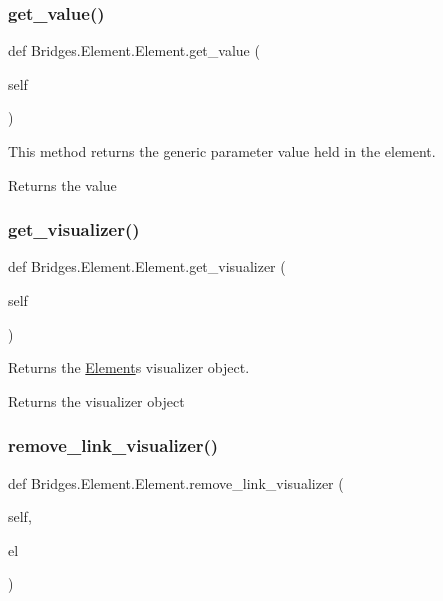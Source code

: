 \subsubsection{\texorpdfstring{get\+\_\+value()}{get\_value()}}
{\footnotesize\ttfamily def Bridges.\+Element.\+Element.\+get\+\_\+value (\begin{DoxyParamCaption}\item[{}]{self }\end{DoxyParamCaption})}



This method returns the generic parameter value held in the element. 

\begin{DoxyReturn}{Returns}
the value 
\end{DoxyReturn}
\mbox{\label{class_bridges_1_1_element_1_1_element_a02945b22b48bf5517088a0db8b70fa94}} 
\subsubsection{\texorpdfstring{get\+\_\+visualizer()}{get\_visualizer()}}
{\footnotesize\ttfamily def Bridges.\+Element.\+Element.\+get\+\_\+visualizer (\begin{DoxyParamCaption}\item[{}]{self }\end{DoxyParamCaption})}



Returns the \mbox{\hyperlink{class_bridges_1_1_element_1_1_element}{Element}}\textquotesingle{}s visualizer object. 

\begin{DoxyReturn}{Returns}
the visualizer object 
\end{DoxyReturn}
\mbox{\label{class_bridges_1_1_element_1_1_element_ae617a08f086c0b9b62a82b84751c9d1e}} 
\subsubsection{\texorpdfstring{remove\+\_\+link\+\_\+visualizer()}{remove\_link\_visualizer()}}
{\footnotesize\ttfamily def Bridges.\+Element.\+Element.\+remove\+\_\+link\+\_\+visualizer (\begin{DoxyParamCaption}\item[{}]{self,  }\item[{}]{el }\end{DoxyParamCaption})}

